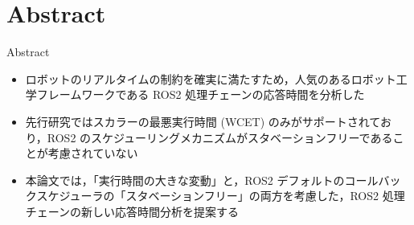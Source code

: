 \section{Abstract}
\label{sec: abstract}

\begin{frame}{Abstract}
    \begin{itemize}
        \item ロボットのリアルタイムの制約を確実に満たすため，人気のあるロボット工学フレームワークである ROS2 処理チェーンの応答時間を分析した

        \item 先行研究ではスカラーの最悪実行時間 (WCET) のみがサポートされており，ROS2 のスケジューリングメカニズムがスタベーションフリーであることが考慮されていない

        \item 本論文では，「実行時間の大きな変動」と，ROS2 デフォルトのコールバックスケジューラの「スタベーションフリー」の両方を考慮した，ROS2 処理チェーンの新しい応答時間分析を提案する
    \end{itemize}
\end{frame}
